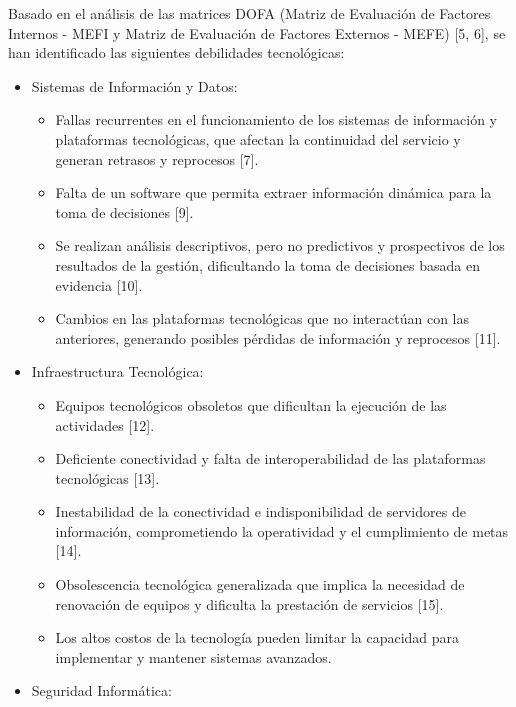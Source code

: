 \documentclass[
	a4paper, %
	12pt, %
]{include/CSSullivanBusinessReport}
\def\tightlist{}
\begin{document}
Basado en el análisis de las matrices DOFA (Matriz de Evaluación de
Factores Internos - MEFI y Matriz de Evaluación de Factores Externos -
MEFE) {[}5, 6{]}, se han identificado las siguientes debilidades
tecnológicas:

\begin{itemize}
\tightlist
\item
  Sistemas de Información y Datos:

  \begin{itemize}
  \tightlist
  \item
    Fallas recurrentes en el funcionamiento de los sistemas de
    información y plataformas tecnológicas, que afectan la continuidad
    del servicio y generan retrasos y reprocesos {[}7{]}.
  \item
    Falta de un software que permita extraer información dinámica para
    la toma de decisiones {[}9{]}.
  \item
    Se realizan análisis descriptivos, pero no predictivos y
    prospectivos de los resultados de la gestión, dificultando la toma
    de decisiones basada en evidencia {[}10{]}.
  \item
    Cambios en las plataformas tecnológicas que no interactúan con las
    anteriores, generando posibles pérdidas de información y reprocesos
    {[}11{]}.
  \end{itemize}
\item
  Infraestructura Tecnológica:

  \begin{itemize}
  \tightlist
  \item
    Equipos tecnológicos obsoletos que dificultan la ejecución de las
    actividades {[}12{]}.
  \item
    Deficiente conectividad y falta de interoperabilidad de las
    plataformas tecnológicas {[}13{]}.
  \item
    Inestabilidad de la conectividad e indisponibilidad de servidores de
    información, comprometiendo la operatividad y el cumplimiento de
    metas {[}14{]}.
  \item
    Obsolescencia tecnológica generalizada que implica la necesidad de
    renovación de equipos y dificulta la prestación de servicios
    {[}15{]}.
  \item
    Los altos costos de la tecnología pueden limitar la capacidad para
    implementar y mantener sistemas avanzados.
  \end{itemize}
\item
  Seguridad Informática:


\end{itemize}
\end{document}

